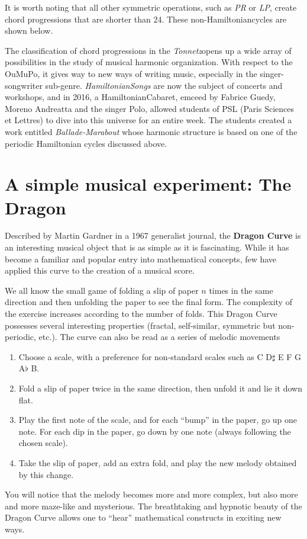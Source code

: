 \documentclass{article}
\newcommand{\Tonnetz}{\emph{Tonnetz}}
\newcommand{\Hamiltonian}{Hamiltonian}
\begin{document}
It is worth noting that all other symmetric operations, such as \emph{PR} or
\emph{LP}, create chord progressions that are shorter than 24.  These
non-\Hamiltonian cycles are shown below.

The classification of chord progressions in the \Tonnetz opens up a wide
array of possibilities in the study of musical harmonic organization.  With
respect to the OuMuPo, it gives way to new ways of writing music, especially
in the singer-songwriter sub-genre.  \emph{\Hamiltonian Songs} are now the
subject of concerts and workshops, and in 2016, a \Hamiltonian Cabaret,
emceed by Fabrice Guedy, Moreno Andreatta and the singer Polo, allowed
students of PSL (Paris Sciences et Lettres) to dive into this universe for
an entire week.  The students created a work entitled \emph{Ballade-Marabout}
whose harmonic structure is based on one of the periodic Hamiltonian cycles
discussed above.

\section*{A simple musical experiment: The Dragon}
Described by Martin Gardner in a 1967 generalist journal, the \textbf{Dragon
Curve} is an interesting musical object that is as simple as it is
fascinating.  While it has become a familiar and popular entry into
mathematical concepts, few have applied this curve to the creation of a
musical score.

We all know the small game of folding a slip of paper $n$ times in the same
direction and then unfolding the paper to see the final form.  The
complexity of the exercise increases according to the number of folds.  This
Dragon Curve possesses several interesting properties (fractal,
self-similar, symmetric but non-periodic, etc.).  The curve can also be read
as a series of melodic movements
\begin{enumerate}
\item Choose a scale, with a preference for non-standard scales such as C
D$\sharp$ E F G A$\flat$ B.
\item Fold a slip of paper twice in the same direction, then unfold it and
lie it down flat.
\item Play the first note of the scale, and for each ``bump'' in the paper,
go up one note.  For each dip in the paper, go down by one note (always
following the chosen scale).
\item Take the slip of paper, add an extra fold, and play the new melody
obtained by this change.
\end{enumerate}
You will notice that the melody becomes more and more complex, but also more
and more maze-like and mysterious.  The breathtaking and hypnotic beauty of
the Dragon Curve allows one to ``hear'' mathematical constructs in exciting
new ways.
\end{document}
